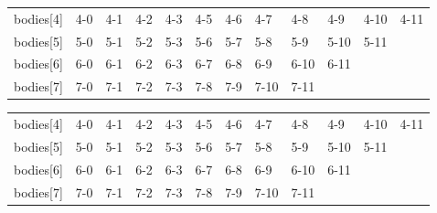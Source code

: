 \documentclass[a4paper]{article}
\begin{document}
\begin{minipage}[b]{.40\textwidth}
  \centering
  \begin{tabular}{llllllllllll}
bodies{[}4{]} & 4-0 & 4-1 & 4-2 & 4-3 & 4-5 & 4-6 & 4-7  & 4-8  & 4-9  & 4-10 & 4-11 \\
bodies{[}5{]} & 5-0 & 5-1 & 5-2 & 5-3 & 5-6 & 5-7 & 5-8  & 5-9  & 5-10 & 5-11 &      \\
bodies{[}6{]} & 6-0 & 6-1 & 6-2 & 6-3 & 6-7 & 6-8 & 6-9  & 6-10 & 6-11 &      &      \\
bodies{[}7{]} & 7-0 & 7-1 & 7-2 & 7-3 & 7-8 & 7-9 & 7-10 & 7-11 &      &      &     
\end{tabular}
  \label{tab:R1_t1}
\end{minipage} \qquad
\begin{minipage}[b]{.40\textwidth}
  \centering
  \begin{tabular}{llllllllllll}
bodies{[}4{]} & 4-0 & 4-1 & 4-2 & 4-3 & 4-5 & 4-6 & 4-7  & 4-8  & 4-9  & 4-10 & 4-11 \\
bodies{[}5{]} & 5-0 & 5-1 & 5-2 & 5-3 & 5-6 & 5-7 & 5-8  & 5-9  & 5-10 & 5-11 &      \\
bodies{[}6{]} & 6-0 & 6-1 & 6-2 & 6-3 & 6-7 & 6-8 & 6-9  & 6-10 & 6-11 &      &      \\
bodies{[}7{]} & 7-0 & 7-1 & 7-2 & 7-3 & 7-8 & 7-9 & 7-10 & 7-11 &      &      &     
\end{tabular}
  \label{tab:R1_t2}
\end{minipage}
\end{document}
